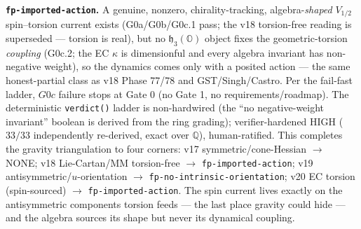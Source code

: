 \documentclass[11pt]{article}
\newcommand{\h}{\mathfrak{h}}
\newcommand{\Oo}{\mathbb{O}}
\begin{document}
\textbf{\texttt{fp-imported-action}.} A genuine, nonzero, chirality-tracking,
algebra-\emph{shaped} $V_{1/2}$ spin--torsion current exists (G0a/G0b/G0c.1 pass; the
v18 torsion-free reading is superseded --- torsion is real), but no $\h_3(\Oo)$
object fixes the geometric-torsion \emph{coupling} (G0c.2; the EC $\kappa$ is
dimensionful and every algebra invariant has non-negative weight), so the dynamics
comes only with a posited action --- the same honest-partial class as v18 Phase
77/78 and GST/Singh/Castro. Per the fail-fast ladder, $G0c$ failure stops at Gate 0
(no Gate 1, no requirements/roadmap). The deterministic \texttt{verdict()} ladder is
non-hardwired (the ``no negative-weight invariant'' boolean is derived from the ring
grading); verifier-hardened HIGH ($33/33$ independently re-derived, exact over
$\mathbb{Q}$), human-ratified. This completes the gravity triangulation to four
corners: v17 symmetric/cone-Hessian $\to$ NONE; v18 Lie-Cartan/MM torsion-free $\to$
\texttt{fp-imported-action}; v19 antisymmetric/$u$-orientation $\to$
\texttt{fp-no-intrinsic-orientation}; v20 EC torsion (spin-sourced) $\to$
\texttt{fp-imported-action}. The spin current lives exactly on the antisymmetric
components torsion feeds --- the last place gravity could hide --- and the algebra
sources its shape but never its dynamical coupling.
\end{document}
